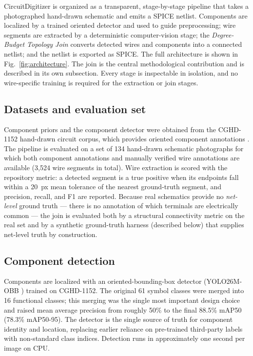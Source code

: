 CircuitDigitizer is organized as a transparent, stage-by-stage pipeline that takes
a photographed hand-drawn schematic and emits a SPICE netlist. Components are
localized by a trained oriented detector and used to guide preprocessing; wire
segments are extracted by a deterministic computer-vision stage; the
\emph{Degree-Budget Topology Join} converts detected wires and components into a
connected netlist; and the netlist is exported as SPICE. The full architecture is
shown in Fig.~\ref{fig:architecture}. The join is the central methodological
contribution and is described in its own subsection. Every stage is inspectable in
isolation, and no wire-specific training is required for the extraction or join
stages.

\subsection*{Datasets and evaluation set}

Component priors and the component detector were obtained from the CGHD-1152
hand-drawn circuit corpus, which provides oriented component annotations
\cite{Thoma2021}. The pipeline is evaluated on a set of 134 hand-drawn schematic
photographs for which both component annotations and manually verified wire
annotations are available (3{,}524 wire segments in total). Wire extraction is
scored with the repository metric: a detected segment is a true positive when its
endpoints fall within a 20~px mean tolerance of the nearest ground-truth segment,
and precision, recall, and F1 are reported. Because real schematics provide no
\emph{net-level} ground truth --- there is no annotation of which terminals are
electrically common --- the join is evaluated both by a structural connectivity
metric on the real set and by a synthetic ground-truth harness (described below)
that supplies net-level truth by construction.

\subsection*{Component detection}

Components are localized with an oriented-bounding-box detector
(YOLO26M-OBB \cite{UltralyticsYOLO}) trained on CGHD-1152. The original 61 symbol
classes were merged into 16 functional classes; this merging was the single most
important design choice and raised mean average precision from roughly 50\% to the
final 88.5\% mAP50 (78.3\% mAP50-95). The detector is the single source of truth
for component identity and location, replacing earlier reliance on pre-trained
third-party labels with non-standard class indices. Detection runs in
approximately one second per image on CPU.

